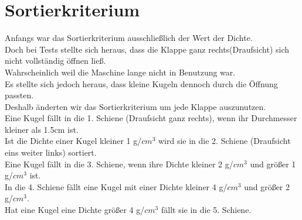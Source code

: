 \section{Sortierkriterium}\label{Sortierkriterium}
Anfangs war das Sortierkriterium ausschließlich der Wert der Dichte.\\
Doch bei Tests stellte sich heraus, dass die Klappe ganz rechts(Draufsicht) sich nicht vollständig öffnen ließ.\\ 
Wahrscheinlich weil die Maschine lange nicht in Benutzung war.\\
Es stellte sich jedoch heraus, dass kleine Kugeln dennoch durch die Öffnung passten.\\
Deshalb änderten wir das Sortierkriterium um jede Klappe auszunutzen.\\
Eine Kugel fällt in die 1. Schiene (Draufsicht ganz rechts), wenn ihr Durchmesser kleiner als 1.5cm ist.\\
Ist die Dichte einer Kugel kleiner 1 g/$cm^3$ wird sie in die 2. Schiene (Draufsicht eins weiter links) sortiert.\\
Eine Kugel fällt in die 3. Schiene, wenn ihre Dichte kleiner 2 g/$cm^3$ und größer 1 g/$cm^3$ ist.\\
In die 4. Schiene fällt eine Kugel mit einer Dichte kleiner 4 g/$cm^3$ und größer 2 g/$cm^3$.\\
Hat eine Kugel eine Dichte größer 4 g/$cm^3$ fällt sie in die 5. Schiene.\\ 
\newpage

